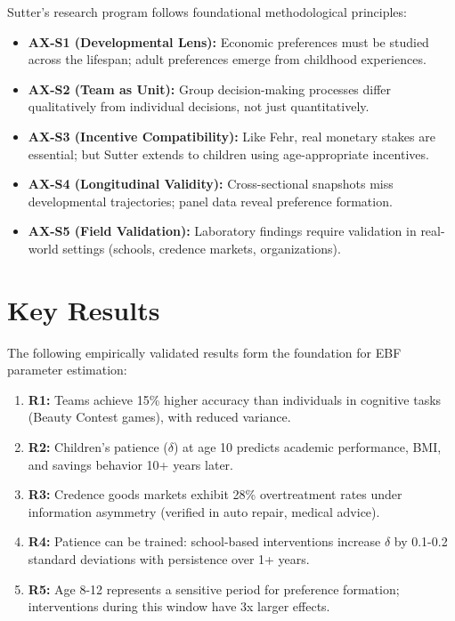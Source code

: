 Sutter's research program follows foundational methodological principles:

\begin{itemize}
    \item \textbf{AX-S1 (Developmental Lens):} Economic preferences must be studied
    across the lifespan; adult preferences emerge from childhood experiences.

    \item \textbf{AX-S2 (Team as Unit):} Group decision-making processes differ
    qualitatively from individual decisions, not just quantitatively.

    \item \textbf{AX-S3 (Incentive Compatibility):} Like Fehr, real monetary stakes
    are essential; but Sutter extends to children using age-appropriate incentives.

    \item \textbf{AX-S4 (Longitudinal Validity):} Cross-sectional snapshots miss
    developmental trajectories; panel data reveal preference formation.

    \item \textbf{AX-S5 (Field Validation):} Laboratory findings require validation
    in real-world settings (schools, credence markets, organizations).
\end{itemize}


\section{Key Results}
\label{sec:sut-results}

The following empirically validated results form the foundation for EBF parameter
estimation:

\begin{enumerate}
    \item \textbf{R1:} Teams achieve 15\% higher accuracy than individuals in
    cognitive tasks (Beauty Contest games), with reduced variance.

    \item \textbf{R2:} Children's patience ($\delta$) at age 10 predicts academic
    performance, BMI, and savings behavior 10+ years later.

    \item \textbf{R3:} Credence goods markets exhibit 28\% overtreatment rates
    under information asymmetry (verified in auto repair, medical advice).

    \item \textbf{R4:} Patience can be trained: school-based interventions increase
    $\delta$ by 0.1-0.2 standard deviations with persistence over 1+ years.

    \item \textbf{R5:} Age 8-12 represents a sensitive period for preference
    formation; interventions during this window have 3x larger effects.
\end{enumerate}


